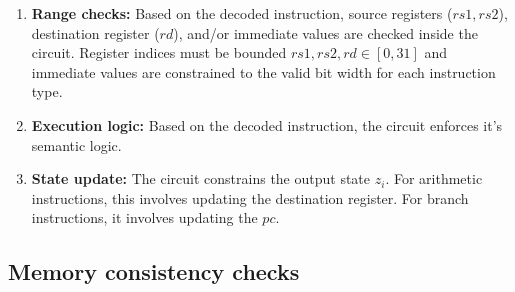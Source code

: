 \begin{enumerate}
\begin{enumerate}
		      \item \textbf{\texttt{functX} consistency:}
		            Certain instructions need additional fields from their binary format
		            to be uniquely decodable. Instruction flags subset of those
		            that require \texttt{funct3} is defined as $S_{\texttt{F3}}
			            \subset S$ and subset for those that require \texttt{funct7} as
		            $S_{\texttt{F7}} \subset S$\footnote{Instruction \texttt{ADD}
			            and \texttt{SUB} have the same \texttt{OPCODE} and
			            \texttt{funct3}, but their \texttt{funct7} differ}.
		            The circuit enforces:
		            \begin{equation}
			            \sum_{s \in S_{\texttt{F3}}} s \cdot (z_{\texttt{INSTRUCTION}}[12:14] - \texttt{F3}_s) = 0
		            \end{equation}
		            \begin{equation}
			            \sum_{s \in S_{\texttt{F7}}} s \cdot (z_{\texttt{INSTRUCTION}}[25:31] - \texttt{F7}_s) = 0
		            \end{equation}
		            Instructions that do not require these fields, are not in the
		            subsets, and these terms equal to 0.

	      \end{enumerate}

	\item \textbf{Range checks:} Based on the decoded instruction, source
	      registers ($rs1, rs2$), destination register ($rd$), and/or immediate
	      values are checked inside the circuit.
	      Register indices must be bounded $rs1, rs2, rd \in [0, 31]$
	      and immediate values are constrained to the valid bit width for each
	      instruction type.

	\item \textbf{Execution logic:} Based on the decoded instruction, the circuit
	      enforces it's semantic logic.

	\item \textbf{State update:} The circuit constrains the output state
	      $z_i$. For arithmetic instructions, this involves updating the
	      destination register. For branch instructions, it involves updating
	      the $pc$.
\end{enumerate}

\subsection{Memory consistency checks}

